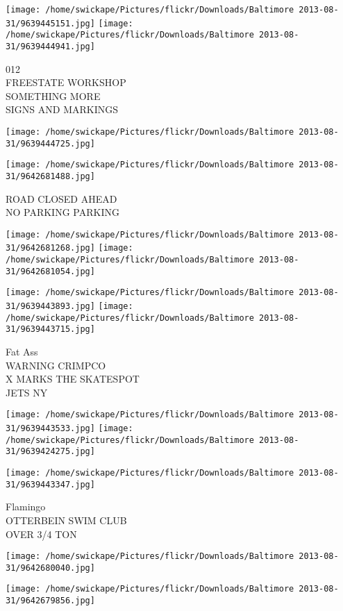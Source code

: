 \documentclass[10pt,letterpaper]{article}
\begin{document}
\texttt{[image: /home/swickape/Pictures/flickr/Downloads/Baltimore 2013-08-31/9639445151.jpg]}
\texttt{[image: /home/swickape/Pictures/flickr/Downloads/Baltimore 2013-08-31/9639444941.jpg]}

012\\
FREESTATE WORKSHOP\\
SOMETHING MORE\\
SIGNS AND MARKINGS
\pagebreak

\texttt{[image: /home/swickape/Pictures/flickr/Downloads/Baltimore 2013-08-31/9639444725.jpg]}

\vspace{0.25in}
\texttt{[image: /home/swickape/Pictures/flickr/Downloads/Baltimore 2013-08-31/9642681488.jpg]}

ROAD CLOSED AHEAD\\
NO PARKING PARKING
\pagebreak

\texttt{[image: /home/swickape/Pictures/flickr/Downloads/Baltimore 2013-08-31/9642681268.jpg]}
\texttt{[image: /home/swickape/Pictures/flickr/Downloads/Baltimore 2013-08-31/9642681054.jpg]}

\texttt{[image: /home/swickape/Pictures/flickr/Downloads/Baltimore 2013-08-31/9639443893.jpg]}
\texttt{[image: /home/swickape/Pictures/flickr/Downloads/Baltimore 2013-08-31/9639443715.jpg]}

Fat Ass\\
WARNING CRIMPCO\\
X MARKS THE SKATESPOT\\
JETS NY
\pagebreak

\texttt{[image: /home/swickape/Pictures/flickr/Downloads/Baltimore 2013-08-31/9639443533.jpg]}
\texttt{[image: /home/swickape/Pictures/flickr/Downloads/Baltimore 2013-08-31/9639424275.jpg]}

\texttt{[image: /home/swickape/Pictures/flickr/Downloads/Baltimore 2013-08-31/9639443347.jpg]}

Flamingo\\
OTTERBEIN SWIM CLUB\\
OVER 3/4 TON
\pagebreak

\texttt{[image: /home/swickape/Pictures/flickr/Downloads/Baltimore 2013-08-31/9642680040.jpg]}

\vspace{0.25in}
\texttt{[image: /home/swickape/Pictures/flickr/Downloads/Baltimore 2013-08-31/9642679856.jpg]}
\end{document}
